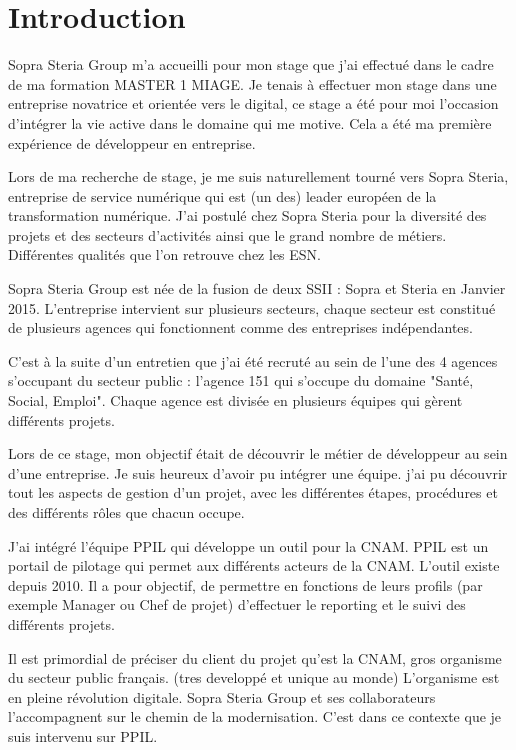 \chapter*{Introduction}
\label{chap:introduction}

Sopra Steria Group m'a accueilli pour mon stage que j'ai effectué dans le cadre de ma formation MASTER 1 MIAGE. Je tenais à effectuer mon stage dans une entreprise novatrice et orientée vers le digital, ce stage a été pour moi l'occasion d'intégrer la vie active dans le domaine qui me motive. Cela a été ma première expérience de développeur en entreprise.

Lors de ma recherche de stage, je me suis naturellement tourné vers Sopra Steria, entreprise de service numérique qui est (un des) leader européen de la transformation numérique.
J'ai postulé chez Sopra Steria pour la diversité des projets et des secteurs d'activités ainsi que le grand nombre de métiers. Différentes qualités que l'on retrouve chez les ESN. 

Sopra Steria Group est née de la fusion de deux SSII : Sopra et Steria en Janvier 2015.
L'entreprise intervient sur plusieurs secteurs, chaque secteur est constitué de plusieurs agences qui fonctionnent comme des entreprises indépendantes. 

C'est à la suite d’un entretien que j'ai été recruté au sein de l’une des 4 agences s'occupant du secteur public : l’agence 151 qui s’occupe du domaine "Santé, Social, Emploi".
Chaque agence est divisée en plusieurs équipes qui gèrent différents projets.

Lors de ce stage, mon objectif était de découvrir le métier de développeur au sein d'une entreprise. Je suis heureux d'avoir pu intégrer une équipe. j'ai pu découvrir tout les aspects de gestion d'un projet, avec les différentes étapes, procédures et des différents rôles que chacun occupe.

J'ai intégré l'équipe PPIL qui développe un outil pour la CNAM. PPIL est un portail de pilotage qui permet aux différents acteurs de la CNAM. L'outil existe depuis 2010. Il a pour objectif, de permettre en fonctions de leurs profils (par exemple Manager ou Chef de projet) d'effectuer le reporting et le suivi des différents projets. 

Il est primordial de préciser du client du projet qu'est la CNAM, gros organisme du secteur public français. (tres developpé et unique au monde) L'organisme est en pleine révolution digitale. Sopra Steria Group et ses collaborateurs l’accompagnent sur le chemin de la modernisation.
C’est dans ce contexte que je suis intervenu sur PPIL. 


